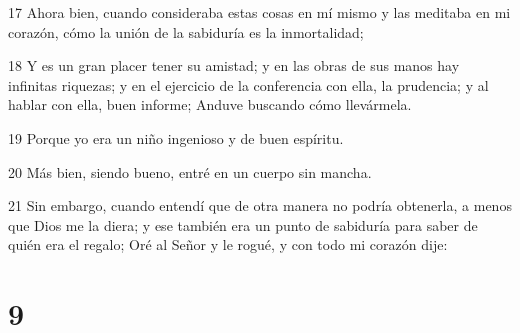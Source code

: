 \par 17 Ahora bien, cuando consideraba estas cosas en mí mismo y las meditaba en mi corazón, cómo la unión de la sabiduría es la inmortalidad;
\par 18 Y es un gran placer tener su amistad; y en las obras de sus manos hay infinitas riquezas; y en el ejercicio de la conferencia con ella, la prudencia; y al hablar con ella, buen informe; Anduve buscando cómo llevármela.
\par 19 Porque yo era un niño ingenioso y de buen espíritu.
\par 20 Más bien, siendo bueno, entré en un cuerpo sin mancha.
\par 21 Sin embargo, cuando entendí que de otra manera no podría obtenerla, a menos que Dios me la diera; y ese también era un punto de sabiduría para saber de quién era el regalo; Oré al Señor y le rogué, y con todo mi corazón dije:

\chapter{9}

